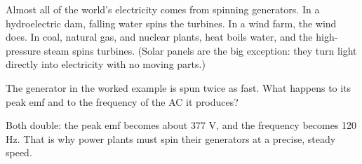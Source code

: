 Almost all of the world's electricity comes from spinning generators. In a
hydroelectric dam, falling water spins the turbines. In a wind farm, the
wind does. In coal, natural gas, and nuclear plants, heat boils water, and
the high-pressure steam spins turbines. (Solar panels are the big
exception: they turn light directly into electricity with no moving parts.)

\begin{Exercise}[title={Spin it faster}, label=emg_gen]
The generator in the worked example is spun twice as fast. What happens to
its peak emf and to the frequency of the AC it produces?
\end{Exercise}
\begin{Answer}[ref=emg_gen]
Both double: the peak emf becomes about 377 V, and the frequency becomes
120 Hz. That is why power plants must spin their generators at a precise,
steady speed.
\end{Answer}
